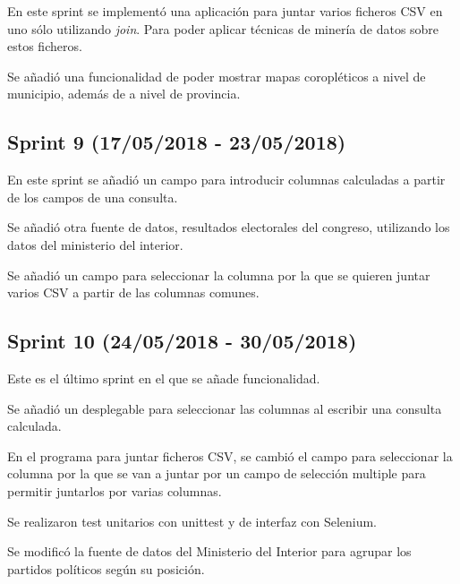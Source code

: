 En este sprint se implementó una aplicación para juntar varios ficheros CSV en uno sólo utilizando \textit{join}. Para poder aplicar técnicas de minería de datos sobre estos ficheros.

Se añadió una funcionalidad de poder mostrar mapas coropléticos a nivel de municipio, además de a nivel de provincia.



\subsection{Sprint 9 (17/05/2018 - 23/05/2018)}

En este sprint se añadió un campo para introducir columnas calculadas a partir de los campos de una consulta. 

Se añadió otra fuente de datos, resultados electorales del congreso, utilizando los datos del ministerio del interior.

Se añadió un campo para seleccionar la columna por la que se quieren juntar varios CSV a partir de las columnas comunes.



\subsection{Sprint 10 (24/05/2018 - 30/05/2018)}

Este es el último sprint en el que se añade funcionalidad.

Se añadió un desplegable para seleccionar las columnas al escribir una consulta calculada.

En el programa para juntar ficheros CSV, se cambió el campo para seleccionar la columna por la que se van a juntar por un campo de selección multiple para permitir juntarlos por varias columnas.

Se realizaron test unitarios con unittest y de interfaz con Selenium.

Se modificó la fuente de datos del Ministerio del Interior para agrupar los partidos políticos según su posición.


